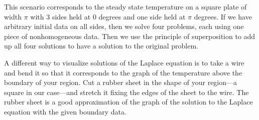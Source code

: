 \documentclass{ximera}
\begin{document}
This scenario corresponds to the steady state temperature on a square plate of width $\pi$ with 3 sides held at 0 degrees and one side held at $\pi$ degrees. If we have arbitrary initial data on all sides, then we solve four problems, each using one piece of nonhomogeneous data.  Then we use the principle of superposition to add up all four solutions to have a solution to the original problem.

A different way to visualize solutions of the Laplace equation is to take a wire and bend it so that it corresponds to the graph of the temperature above the boundary of your region.  Cut a rubber sheet in the shape of your region---a square in our case---and stretch it fixing the edges of the sheet to the wire. The rubber sheet is a good approximation of the graph of the solution to the Laplace equation with the given boundary data.
\end{document}
